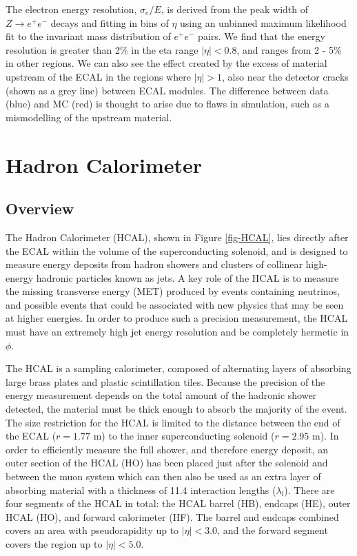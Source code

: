 The electron energy resolution, $\sigma_e/E$, is derived from the peak width of $Z \to e^+e^-$ decays and fitting in bins of $\eta$ using an unbinned maximum likelihood fit to the invariant mass distribution of $e^+e^-$ pairs. We find that the energy resolution is greater than 2\% in the eta range $|\eta| < 0.8$, and ranges from 2 - 5\% in other regions. We can also see the effect created by the excess of material upstream of the ECAL in the regions where $|\eta| > 1$, also near the detector cracks (shown as a grey line) between ECAL modules. The difference between data (blue) and MC (red) is thought to arise due to flaws in simulation, such as a mismodelling of the upstream material.


\section{Hadron Calorimeter} \label{sec-HadronCalorimeter}

\subsection{Overview}

The Hadron Calorimeter (HCAL), shown in Figure \ref{fig-HCAL}, lies directly after the ECAL within the volume of the superconducting solenoid, and is designed to measure energy deposits from hadron showers and clusters of collinear high-energy hadronic particles known as jets. A key role of the HCAL is to measure the missing transverse energy (MET) produced by events containing neutrinos, and possible events that could be associated with new physics that may be seen at higher energies. In order to produce such a precision measurement, the HCAL must have an extremely high jet energy resolution and be completely hermetic in $\phi$. 

The HCAL is a sampling calorimeter, composed of alternating layers of absorbing large brass plates and plastic scintillation tiles. Because the precision of the energy measurement depends on the total amount of the hadronic shower detected, the material must be thick enough to absorb the majority of the event. The size restriction for the HCAL is limited to the distance between the end of the ECAL ($r=1.77$ m) to the inner superconducting solenoid ($r=2.95$ m). In order to efficiently measure the full shower, and therefore energy deposit, an outer section of the HCAL (HO) has been placed just after the solenoid and between the muon system which can then also be used as an extra layer of absorbing material with a thickness of 11.4 interaction lengths ($\lambda_l$). There are four segments of the HCAL in total: the HCAL barrel (HB), endcaps (HE), outer HCAL (HO), and forward calorimeter (HF). The barrel and endcaps combined covers an area with pseudorapidity up to $|\eta|<3.0$, and the forward segment covers the region up to $|\eta|<5.0$.  

